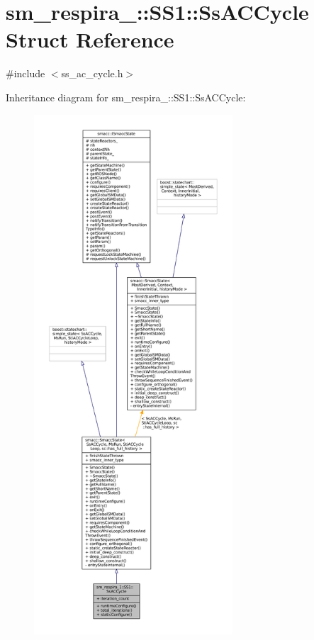 \hypertarget{structsm__respira__1_1_1SS1_1_1SsACCycle}{}\section{sm\+\_\+respira\+\_\+:\+:S\+S1\+:\+:Ss\+A\+C\+Cycle Struct Reference}
\label{structsm__respira__1_1_1SS1_1_1SsACCycle}


{\ttfamily \#include $<$ss\+\_\+ac\+\_\+cycle.\+h$>$}



Inheritance diagram for sm\+\_\+respira\+\_\+:\+:S\+S1\+:\+:Ss\+A\+C\+Cycle\+:
\nopagebreak
\begin{figure}[H]
\begin{center}
\leavevmode
\includegraphics[height=550pt]{structsm__respira__1_1_1SS1_1_1SsACCycle__inherit__graph}
\end{center}
\end{figure}


